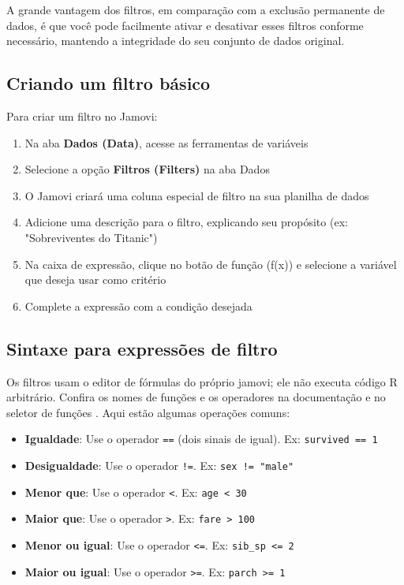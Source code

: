 A grande vantagem dos filtros, em comparação com a exclusão permanente de dados, é que você pode facilmente ativar e desativar esses filtros conforme necessário, mantendo a integridade do seu conjunto de dados original.

\subsection{Criando um filtro básico}

Para criar um filtro no Jamovi:

\begin{enumerate}
    \item Na aba \textbf{Dados (Data)}, acesse as ferramentas de variáveis
    \item Selecione a opção \textbf{Filtros (Filters)} na aba Dados
    \item O Jamovi criará uma coluna especial de filtro na sua planilha de dados
    \item Adicione uma descrição para o filtro, explicando seu propósito (ex: "Sobreviventes do Titanic")
    \item Na caixa de expressão, clique no botão de função (f(x)) e selecione a variável que deseja usar como critério
    \item Complete a expressão com a condição desejada
\end{enumerate}


\subsection{Sintaxe para expressões de filtro}

Os filtros usam o editor de fórmulas do próprio jamovi; ele não executa código R arbitrário. Confira os nomes de funções e os operadores na documentação e no seletor de funções \parencite{JamoviFuncoes}. Aqui estão algumas operações comuns:

\begin{itemize}
    \item \textbf{Igualdade}: Use o operador \texttt{==} (dois sinais de igual). Ex: \texttt{survived == 1}
    \item \textbf{Desigualdade}: Use o operador \texttt{!=}. Ex: \texttt{sex != "male"}
    \item \textbf{Menor que}: Use o operador \texttt{<}. Ex: \texttt{age < 30}
    \item \textbf{Maior que}: Use o operador \texttt{>}. Ex: \texttt{fare > 100}
    \item \textbf{Menor ou igual}: Use o operador \texttt{<=}. Ex: \texttt{sib\_sp <= 2}
    \item \textbf{Maior ou igual}: Use o operador \texttt{>=}. Ex: \texttt{parch >= 1}
\end{itemize}

